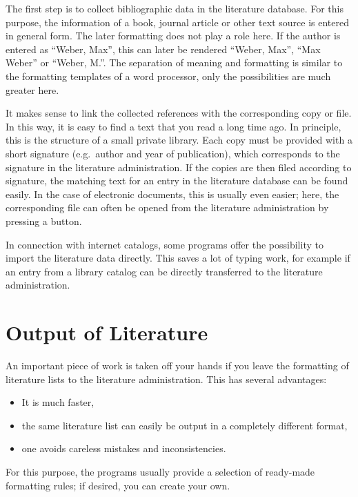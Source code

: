 \documentclass[
  english,
]{scrreprt}
\begin{document}
The first step is to collect bibliographic data in the literature database. For this purpose, the information of a book, journal article or other text source is entered in general form. The later formatting does not play a role here. If the author is entered as “Weber, Max”, this can later be rendered “Weber, Max”, “Max Weber” or “Weber, M.”. The separation of meaning and formatting is similar to the formatting templates of a word processor, only the possibilities are much greater here.

It makes sense to link the collected references with the corresponding copy or file. In this way, it is easy to find a text that you read a long time ago. In principle, this is the structure of a small private library. Each copy must be provided with a short signature (e.g.~author and year of publication), which corresponds to the signature in the literature administration. If the copies are then filed according to signature, the matching text for an entry in the literature database can be found easily. In the case of electronic documents, this is usually even easier; here, the corresponding file can often be opened from the literature administration by pressing a button.

In connection with internet catalogs, some programs offer the possibility to import the literature data directly. This saves a lot of typing work, for example if an entry from a library catalog can be directly transferred to the literature administration.

\section{Output of Literature}\label{output-of-literature}

An important piece of work is taken off your hands if you leave the formatting of literature lists to the literature administration. This has several advantages:

\begin{itemize}
\item
  It is much faster,
\item
  the same literature list can easily be output in a completely different format,
\item
  one avoids careless mistakes and inconsistencies.
\end{itemize}

For this purpose, the programs usually provide a selection of ready-made formatting rules; if desired, you can create your own.
\end{document}
